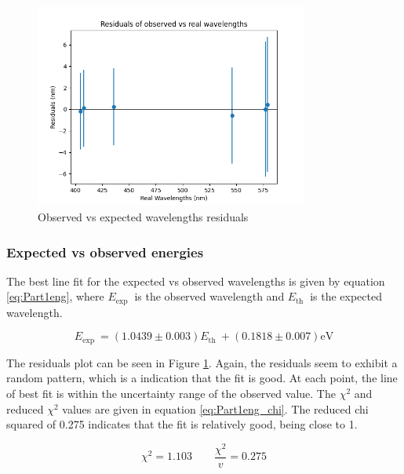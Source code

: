 \begin{figure}[H]
    \centering
    \includegraphics[width=0.8\textwidth]{Results/Sections/Part1/Part1_wavelength_observed_vs_expected_residuals.png}
    \caption{Observed vs expected wavelengths residuals}
    \label{fig:Part1waveU}
\end{figure}



\subsubsection{Expected vs observed energies}

The best line fit for the expected vs observed wavelengths is given by equation \ref{eq:Part1eng}, where $E_{\text {exp }}$ is the observed wavelength and $E_{\text {th }}$ is the expected wavelength.

\begin{equation}
    E_{\text {exp }} = (1.0439 \pm 0.003) E_{\text {th }} + (0.1818 \pm 0.007) \text{eV}
    \label{eq:Part1eng}
\end{equation}

The residuals plot can be seen in Figure \ref{fig:Part1waveU}. Again, the residuals seem to exhibit a random pattern, which is a indication that the fit is good. At each point, the line of best fit is within
the uncertainty range of the observed value. The $\chi^2$ and reduced $\chi^2$ values are given in equation \ref{eq:Part1eng_chi}. The reduced chi squared of 0.275 indicates that the fit is relatively good, being close to 1.

\begin{equation}
    \label{eq:Part1eng_chi}
    \chi^2 = 1.103 \qquad
    \frac{\chi^2}{v} = 0.275
\end{equation}


